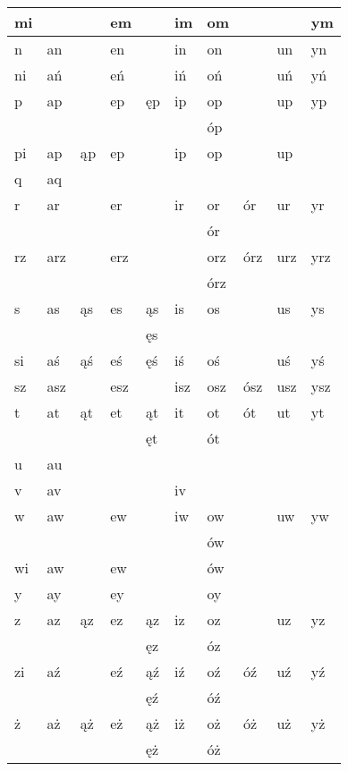 \documentclass{article}
\begin{document}
\begin{longtable}{p{4mm}|p{4mm}p{4mm}p{4mm}p{4mm}p{4mm}p{4mm}p{4mm}p{4mm}p{4mm}}
\hline
mi &  &  & em &  & im & om &  &  & ym\\
\hline
n & an &  & en &  & in & on &  & un & yn\\
\hline
ni & ań &  & eń &  & iń & oń &  & uń & yń\\
\hline
p & ap &  & ep & ęp & ip & op &  & up & yp\\
 &  &  &  &  &  & óp &  &  & \\
\hline
pi & ap & ąp & ep &  & ip & op &  & up & \\
\hline
q & aq &  &  &  &  &  &  &  & \\
\hline
r & ar &  & er &  & ir & or & ór & ur & yr\\
 &  &  &  &  &  & ór &  &  & \\
\hline
rz & arz &  & erz &  &  & orz & órz & urz & yrz\\
 &  &  &  &  &  & órz &  &  & \\
\hline
s & as & ąs & es & ąs & is & os &  & us & ys\\
 &  &  &  & ęs &  &  &  &  & \\
\hline
si & aś & ąś & eś & ęś & iś & oś &  & uś & yś\\
\hline
sz & asz &  & esz &  & isz & osz & ósz & usz & ysz\\
\hline
t & at & ąt & et & ąt & it & ot & ót & ut & yt\\
 &  &  &  & ęt &  & ót &  &  & \\
\hline
u & au &  &  &  &  &  &  &  & \\
\hline
v & av &  &  &  & iv &  &  &  & \\
\hline
w & aw &  & ew &  & iw & ow &  & uw & yw\\
 &  &  &  &  &  & ów &  &  & \\
\hline
wi & aw &  & ew &  &  & ów &  &  & \\
\hline
y & ay &  & ey &  &  & oy &  &  & \\
\hline
z & az & ąz & ez & ąz & iz & oz &  & uz & yz\\
 &  &  &  & ęz &  & óz &  &  & \\
\hline
zi & aź &  & eź & ąź & iź & oź & óź & uź & yź\\
 &  &  &  & ęź &  & óź &  &  & \\
\hline
ż & aż & ąż & eż & ąż & iż & oż & óż & uż & yż\\
 &  &  &  & ęż &  & óż &  &  & \\
\hline
\end{longtable}
\end{document}
